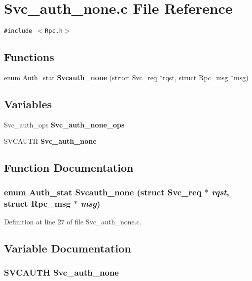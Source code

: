 \section{Svc\_\-auth\_\-none.c File Reference}
\label{Svc__auth__none_8c}
{\tt \#include $<$Rpc.h$>$}\par
\subsection*{Functions}
\begin{CompactItemize}
\item 
enum Auth\_\-stat {\bf Svcauth\_\-none} (struct Svc\_\-req $\ast$rqst, struct Rpc\_\-msg $\ast$msg)
\end{CompactItemize}
\subsection*{Variables}
\begin{CompactItemize}
\item 
Svc\_\-auth\_\-ops {\bf Svc\_\-auth\_\-none\_\-ops}
\item 
SVCAUTH {\bf Svc\_\-auth\_\-none}
\end{CompactItemize}


\subsection{Function Documentation}
\subsubsection{\setlength{\rightskip}{0pt plus 5cm}enum Auth\_\-stat Svcauth\_\-none (struct Svc\_\-req $\ast$ {\em rqst}, struct Rpc\_\-msg $\ast$ {\em msg})}\label{Svc__auth__none_8c_a6}




Definition at line 27 of file Svc\_\-auth\_\-none.c.

\subsection{Variable Documentation}
\subsubsection{\setlength{\rightskip}{0pt plus 5cm}SVCAUTH {\bf Svc\_\-auth\_\-none}}\label{Svc__auth__none_8c_a1}


